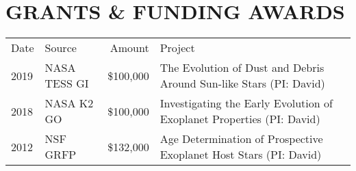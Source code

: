 \section{\large GRANTS \& FUNDING AWARDS}
\begin{tabular}{llrl}
{\centering  \sc Date} &  \sc Source &  \sc Amount &  \sc Project \\
2019 & NASA TESS GI & \$100,000 & The Evolution of Dust and Debris Around Sun-like Stars (PI: David)\\
2018 & NASA K2 GO & \$100,000 & Investigating the Early Evolution of Exoplanet Properties (PI: David)\\
2012 & NSF GRFP & \$132,000 & Age Determination of Prospective Exoplanet Host Stars (PI: David)\\
\end{tabular}
